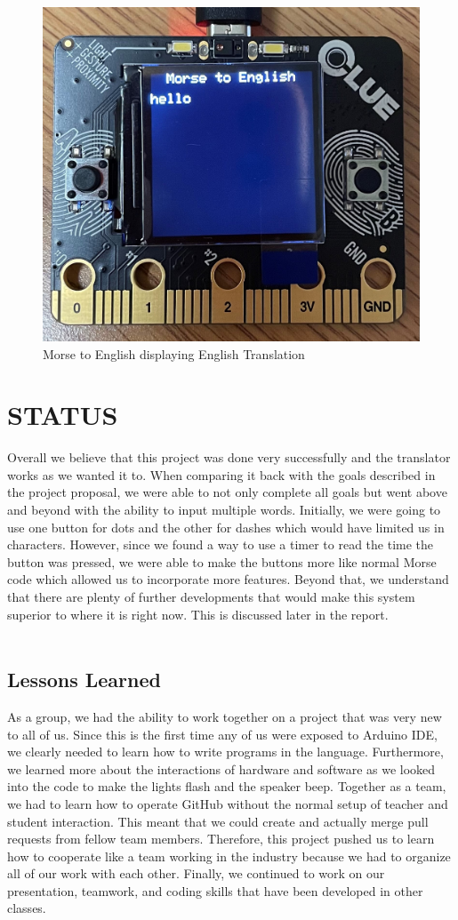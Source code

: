 \documentclass[12pt]{article}
\begin{document}
\begin{figure}[!t]
\centering
\includegraphics[width=4 in]{MtoEE.jpg}
\caption{Morse to English displaying English Translation}
\label{fig:MtoEE}
\end{figure}



\FloatBarrier
\section{STATUS}
Overall we believe that this project was done very successfully and the translator works as we wanted it to. When comparing it back with the goals described in the project proposal, we were able to not only complete all goals but went above and beyond with the ability to input multiple words. Initially, we were going to use one button for dots and the other for dashes which would have limited us in characters. However, since we found a way to use a timer to read the time the button was pressed, we were able to make the buttons more like normal Morse code which allowed us to incorporate more features. Beyond that, we understand that there are plenty of further developments that would make this system superior to where it is right now. This is discussed later in the report.\\
\\
\subsection{Lessons Learned}
As a group, we had the ability to work together on a project that was very new to all of us. Since this is the first time any of us were exposed to Arduino IDE, we clearly needed to learn how to write programs in the language. Furthermore, we learned more about the interactions of hardware and software as we looked into the code to make the lights flash and the speaker beep. Together as a team, we had to learn how to operate GitHub without the normal setup of teacher and student interaction. This meant that we could create and actually merge pull requests from fellow team members. Therefore, this project pushed us to learn how to cooperate like a team working in the industry because we had to organize all of our work with each other. Finally, we continued to work on our presentation, teamwork, and coding skills that have been developed in other classes.\\
\\
\end{document}

